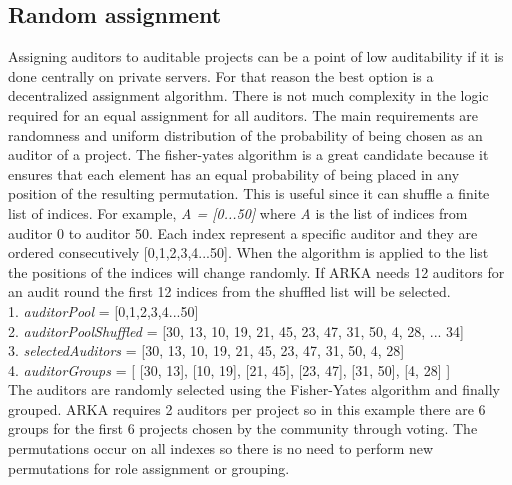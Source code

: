 \documentclass[12pt]{article}
\begin{document}
\subsection { Random assignment }
   
Assigning auditors to auditable projects can be a point of low auditability if it is done centrally on private servers. For that reason the best option is a decentralized assignment algorithm. There is not much complexity in the logic required for an equal assignment for all auditors. The main requirements are randomness and uniform distribution of the probability of being chosen as an auditor of a project. The fisher-yates algorithm is a great candidate because it ensures that each element has an equal probability of being placed in any position of the resulting permutation. This is useful since it can shuffle a finite list of indices. For example, \emph {A = [0...50]} where \emph {A} is the list of indices from auditor 0 to auditor 50. Each index represent a specific auditor and they are ordered consecutively [0,1,2,3,4...50]. When the algorithm is applied to the list the positions of the indices will change randomly. If ARKA needs 12 auditors for an audit round the first 12 indices from the shuffled list will be selected.\\

1. \emph {auditorPool } = [0,1,2,3,4...50] \\
2. \emph {auditorPoolShuffled } = [30, 13, 10, 19, 21, 45, 23, 47, 31, 50,  4, 28, ... 34]\\
3. \emph {selectedAuditors} = [30, 13, 10, 19, 21, 45, 23, 47, 31, 50,  4, 28]\\
4. \emph {auditorGroups } = [ [30, 13], [10, 19], [21, 45], [23, 47], [31, 50],  [4, 28] ]\\

The auditors are randomly selected using the Fisher-Yates algorithm and finally grouped. ARKA requires 2 auditors per project so in this example there are 6 groups for the first 6 projects chosen by the community through voting. The permutations occur on all indexes so there is no need to perform new permutations for role assignment or grouping.
\end{document}
